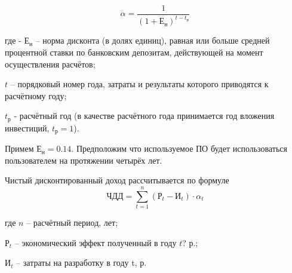 \begin{equation}
	\alpha = \frac{\num{1}}{(\num{1} + \text{Е}_\text{н})^{t - t_\text{р}}}
\end{equation}
\begin{explanationx}
	\item[где] - $\text{Е}_\text{н}$ -- норма дисконта (в долях единиц), равная
		или больше средней процентной ставки по банковским депозитам,
		действующей на момент осуществления расчётов;
	\item $t$ -- порядковый номер года, затраты и результаты которого приводятся
		к расчётному году;
	\item $t_\text{р}$ - расчётный год (в качестве расчётного года принимается
		год вложения инвестиций, $t_\text{р} = \num{1}$).
\end{explanationx}

\def \stavkaBankov {0.1376}
Примем $\text{Е}_\text{н} = \num{0.14}$.
Предположим что используемое ПО будет использоваться пользователем на протяжении
четырёх лет.

Чистый дисконтированный доход рассчитывается по формуле
\begin{equation}
	\text{ЧДД} = \sum^{n}_{t = 1} (\text{Р}_t - \text{И}_t) \cdot \alpha_t
\end{equation}
\begin{explanationx}
	\item[где] $n$ -- расчётный период, лет;
	\item $\text{Р}_t$ -- экономический эффект полученный в году $t$? р.;
	\item $\text{И}_t$ -- затраты на разработку в году t, р.
\end{explanationx}

